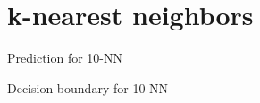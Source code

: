 \section{k-nearest neighbors}

\begin{frame}{Prediction for 10-NN}
\end{frame}

\begin{frame}{Decision boundary for 10-NN}
\end{frame}
